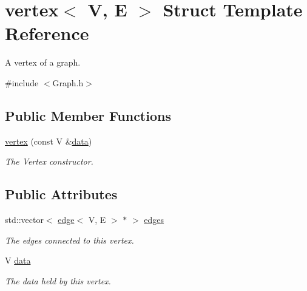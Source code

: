\hypertarget{structvertex}{\section{vertex$<$ V, E $>$ Struct Template Reference}
\label{structvertex}
}


A vertex of a graph.  




{\ttfamily \#include $<$Graph.\+h$>$}

\subsection*{Public Member Functions}
\begin{DoxyCompactItemize}
\item 
\hyperlink{structvertex_ab85bea48c8a6edf3a270df90eee8a7e9}{vertex} (const V \&\hyperlink{structvertex_a2961b0de64b45fe5a2bd630145bffc60}{data})
\begin{DoxyCompactList}\small\item\em The Vertex constructor. \end{DoxyCompactList}\end{DoxyCompactItemize}
\subsection*{Public Attributes}
\begin{DoxyCompactItemize}
\item 
\hypertarget{structvertex_a859c642e4a9c12a780c97cfd0fdf2916}{std\+::vector$<$ \hyperlink{structedge}{edge}$<$ V, E $>$ $\ast$ $>$ \hyperlink{structvertex_a859c642e4a9c12a780c97cfd0fdf2916}{edges}}\label{structvertex_a859c642e4a9c12a780c97cfd0fdf2916}

\begin{DoxyCompactList}\small\item\em The edges connected to this vertex. \end{DoxyCompactList}\item 
\hypertarget{structvertex_a2961b0de64b45fe5a2bd630145bffc60}{V \hyperlink{structvertex_a2961b0de64b45fe5a2bd630145bffc60}{data}}\label{structvertex_a2961b0de64b45fe5a2bd630145bffc60}

\begin{DoxyCompactList}\small\item\em The data held by this vertex. \end{DoxyCompactList}\end{DoxyCompactItemize}


